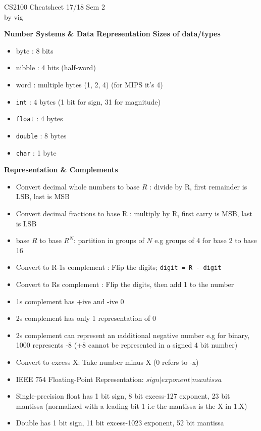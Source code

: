 \documentclass[a4paper]{article} \usepackage[backend=biber, style=numeric, sorting=none]{biblatex}
\begin{document}
\setlength\parindent{0pt} %
\scriptsize
{}

\begin{center}
{\large CS2100 Cheatsheet 17/18 Sem 2}\\{by vig}
\end{center}
    \begin{multicols*}{4}

{\small\textbf{Number Systems \& Data Representation }}
\textbf{Sizes of data/types}
\begin{itemize}[leftmargin=*]
\itemsep -0.5em
\item byte : 8 bits \item nibble : 4 bits (half-word)
\item word : multiple bytes (1, 2, 4) (for MIPS it's 4)
\item \texttt{int} : 4 bytes (1 bit for sign, 31 for magnitude)
\item \texttt{float} : 4 bytes
\item \texttt{double} : 8 bytes
\item \texttt{char} : 1 byte
\end{itemize}

\textbf{Representation \& Complements}
\begin{itemize}[leftmargin=*]
\itemsep -0.5em
\item Convert decimal whole numbers to base $R$ : divide by R, first remainder is LSB, last is MSB
\item Convert decimal fractions to base R : multiply by R, first carry is MSB, last is LSB
\item base ${R}$ to base ${R^N}$: partition in groups of $N$ e.g groups of 4 for base 2 to base 16
\item Convert to R-1s complement : Flip the digits; \texttt{digit = R - digit}
\item Convert to Rs complement : Flip the digits, then add 1 to the number
\item 1s complement has +ive and -ive 0
\item 2s complement has only 1 representation of 0
\item 2s complement can represent an \i{additional} negative number e.g for binary, 1000 represents -8 (+8 cannot be represented in a signed 4 bit number)
\item Convert to excess X: Take number minus X (0 refers to -x)
\item IEEE 754 Floating-Point Representation:  $sign  | exponent  |  mantissa$
\item Single-precision float has 1 bit sign, 8 bit excess-127 exponent, 23 bit mantissa (normalized with a leading bit 1 i.e the mantissa is the X in 1.X)
\item Double has 1 bit sign, 11 bit excess-1023 exponent, 52 bit mantissa 
\end{itemize}


\end{multicols*}
\end{document}

